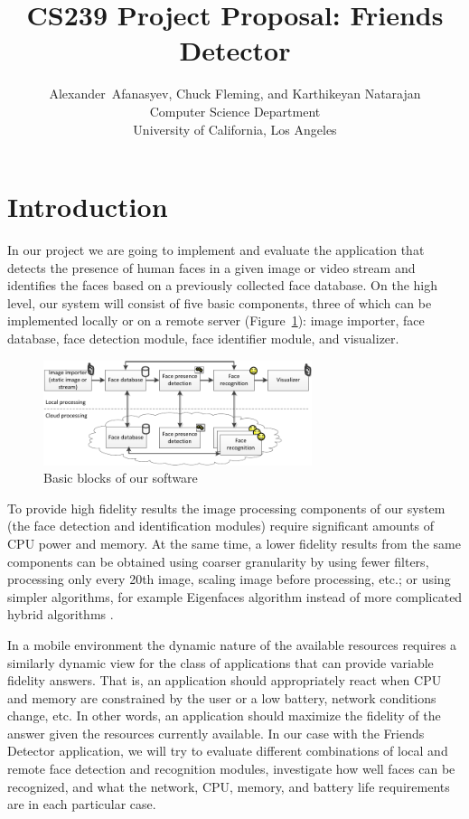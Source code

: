 \documentclass[conference]{IEEEtran}
\title{CS239 Project Proposal: Friends Detector}
\author{Alexander~Afanasyev, Chuck Fleming, and Karthikeyan Natarajan \\
\small Computer Science Department \\
\small University of California, Los Angeles 
}
\begin{document}
\maketitle

\section{Introduction}

In our project we are going to implement and evaluate the application that detects the presence of human faces in a given image or video stream and identifies the faces based on a previously collected face database. On the high level, our system will consist of five basic components, three of which can be implemented locally or on a remote server (Figure~\ref{fig:basic blocks}): image importer, face database, face detection module, face identifier module, and visualizer. 

\begin{figure}[htbp]
	\centering
		\includegraphics[width=0.7\textwidth]{basic_blocks}
	\caption{Basic blocks of our software}
	\label{fig:basic blocks}
\end{figure}

To provide high fidelity results the image processing components of our system (the face detection and identification modules) require significant amounts of CPU power and memory.  At the same time, a lower fidelity results from the same components can be obtained using coarser granularity by using fewer filters, processing only every 20th image, scaling image before processing, etc.; or using simpler algorithms, for example Eigenfaces algorithm \cite{Turk:1991:Eigenfaces-for-recognition} instead of more complicated hybrid algorithms \cite{Zhao:2003:Face-recognition:}. 

In a mobile environment the dynamic nature of the available resources requires a similarly dynamic view for the class of applications that can provide variable fidelity answers. That is, an application should appropriately react when CPU and memory are constrained by the user or a low battery, network conditions change, etc. In other words, an application should maximize the fidelity of the answer given the resources currently available. In our case with the Friends Detector application, we will try to evaluate different combinations of local and remote face detection and recognition modules, investigate how well faces can be recognized, and what the network, CPU, memory, and battery life requirements are in each particular case.
\end{document}
